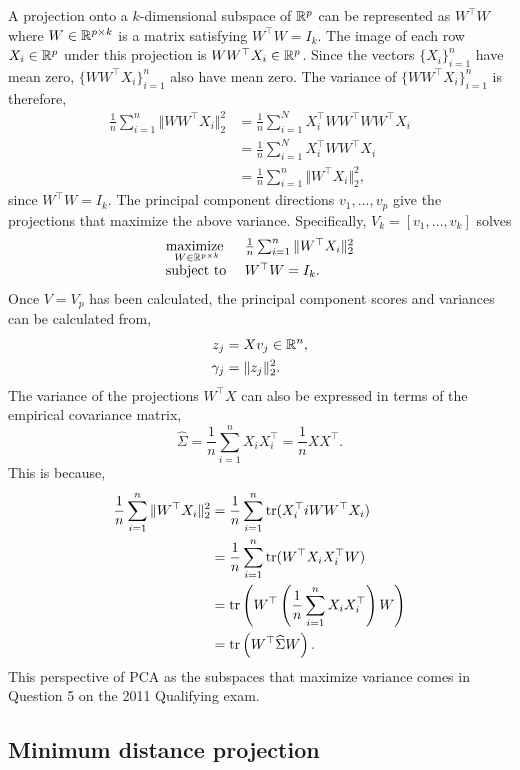 A projection onto a $k$-dimensional subspace of $\mathbb{R}^p$ can be represented as $W^\top W$ where $W \in \mathbb{R}^{p \times k}$ is a matrix satisfying $W^\top W = I_k$. The image of each row $X_i \in \mathbb{R}^p$ under this projection is $WW^\top X_i \in \mathbb{R}^p$. Since the vectors $\{X_i\}_{i=1}^n$ have mean zero, $\{WW^\top X_i\}_{i=1}^n$ also have mean zero. The variance of $\{WW^\top X_i\}_{i=1}^n$ is therefore,
\begin{align}
    \frac{1}{n}\sum_{i=1}^n \Vert WW^\top X_i \Vert_2^2 &= \frac{1}{n}\sum_{i=1}^N X_i^\top WW^\top WW^\top X_i \nonumber \\
    &=\frac{1}{n}\sum_{i=1}^N X_i^\top WW^\top X_i\nonumber \\
    &=\frac{1}{n}\sum_{i=1}^n \Vert W^\top X_i\Vert_2^2\label{eq:variance},
\end{align} 
since $W^\top W = I_k$. The principal component directions $v_1,\ldots,v_p$ give the projections that maximize the above variance. Specifically, $V_k = [v_1,\ldots,v_k]$ solves
\[\begin{array}{ll}
    \underset{W \in \mathbb{R}^{p \times k}}{\mbox{maximize }} &\frac{1}{n}\sum_{i=1}^n \Vert W^\top X_i \Vert_2^2\\
    \mbox{subject to }& W^\top W = I_k.
\end{array} \]
Once $V=V_p$ has been calculated, the principal component scores and variances can be calculated from,
\begin{align*}
    z_j &=Xv_j \in \mathbb{R}^n,\\
    \gamma_j &=\Vert z_j\Vert_2^2.
\end{align*}
The variance of the projections $W^\top X$ can also be expressed in terms of the empirical covariance matrix,
\[\widehat{\Sigma} = \frac{1}{n}\sum_{i=1}^n X_iX_i^\top = \frac{1}{n}XX^\top. \]
This is because,
\begin{align*}
    \frac{1}{n}\sum_{i=1}^n \Vert W^\top X_i\Vert_2^2&=\frac{1}{n}\sum_{i=1}^n \operatorname{tr}(X_i^\top iW W^\top X_i)\\
    &=\frac{1}{n}\sum_{i=1}^n \operatorname{tr}(W^\top X_iX_i^\top W)\\
    &=\operatorname{tr}\left(W^\top \left(\frac{1}{n}\sum_{i=1}^n X_iX_i^\top\right)W\right)\\
    &=\operatorname{tr}\left(W^\top \widehat{\Sigma}W\right).
\end{align*}
This perspective of PCA as the subspaces that maximize variance comes in Question 5 on the 2011 Qualifying exam. 

\subsection{Minimum distance projection}

